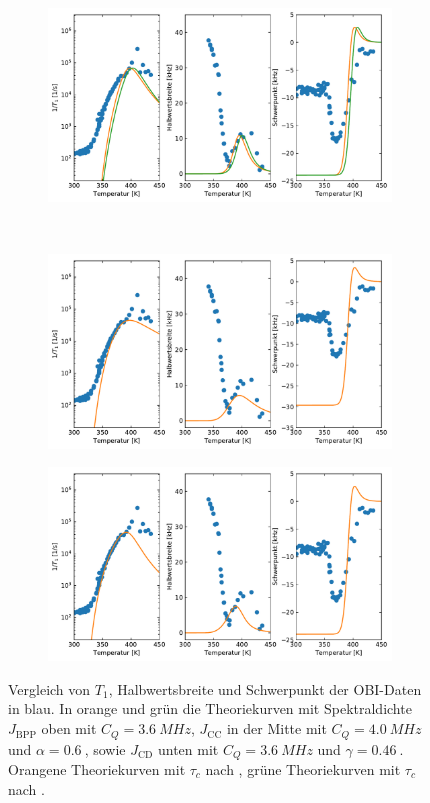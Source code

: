 \begin{figure}
	\centering
	\begin{subfigure}{\textwidth}
		\centering
		\includegraphics[width=.8\textwidth]{graphics/SPEK3/OBI_J_01.pdf}
	\end{subfigure} \\
	\begin{subfigure}{\textwidth}
		\centering
		\includegraphics[width=.8\textwidth]{graphics/SPEK3/OBI_J_cc_01.pdf}
	\end{subfigure}
	\begin{subfigure}{\textwidth}
		\centering
		\includegraphics[width=.8\textwidth]{graphics/SPEK3/OBI_J_cd_01.pdf}
	\end{subfigure}
	\caption{Vergleich von $T_1$, Halbwertsbreite und Schwerpunkt der OBI-Daten in blau. In orange und grün die Theoriekurven mit Spektraldichte $J_\text{BPP}$ oben mit $C_Q = \SI{3.6}{MHz}$, $J_\text{CC}$ in der Mitte mit $C_Q = \SI{4.0}{MHz}$ und $\alpha = \SI{0.6}{}$, sowie $J_\text{CD}$ unten mit $C_Q = \SI{3.6}{MHz}$ und $\gamma = \SI{0.46}{}$. Orangene Theoriekurven mit $\tau_c$ nach \cite{PIMENOV199793}, grüne Theoriekurven mit $\tau_c$ nach \cite{crn_augsburg}.}
	\label{fig:res:theorie_j}
\end{figure}


